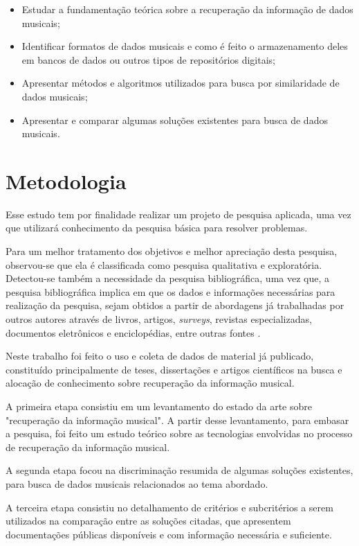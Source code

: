  \begin{itemize}
   \item Estudar a fundamentação teórica sobre a recuperação da informação de dados musicais;
   \item Identificar formatos de dados musicais e como é feito o armazenamento deles em bancos de dados ou outros tipos de repositórios digitais;
   \item Apresentar métodos e algoritmos utilizados para busca por similaridade de dados musicais;
   \item Apresentar e comparar algumas soluções existentes para busca de dados musicais.
 \end{itemize}
 
\section{Metodologia} \label{sec:metodologia}

Esse estudo tem por finalidade realizar um projeto de pesquisa aplicada, uma vez que utilizará conhecimento da pesquisa básica para resolver problemas.

Para um melhor tratamento dos objetivos e melhor apreciação desta pesquisa, observou-se que ela é classificada como pesquisa qualitativa e exploratória. Detectou-se também a necessidade da pesquisa bibliográfica, uma vez que, a pesquisa bibliográfica implica em que os dados e informações necessárias para realização da pesquisa, sejam obtidos a partir de abordagens já trabalhadas por outros autores através de livros, artigos, \textit{surveys}, revistas especializadas, documentos eletrônicos e enciclopédias, entre outras fontes \cite{ednalucia2005}.

Neste trabalho foi feito o uso e coleta de dados de material já publicado, constituído principalmente de teses, dissertações e artigos científicos na busca e alocação de conhecimento sobre recuperação da informação musical.

A primeira etapa consistiu em um levantamento do estado da arte sobre "recuperação da informação musical". A partir desse levantamento, para embasar a pesquisa, foi feito um estudo teórico sobre as tecnologias envolvidas no processo de recuperação da informação musical.

A segunda etapa focou na discriminação resumida de algumas soluções existentes, para busca de dados musicais relacionados ao tema abordado.

A terceira etapa consistiu no detalhamento de critérios e subcritérios a serem utilizados na comparação entre as soluções citadas, que apresentem documentações públicas disponíveis e com informação necessária e suficiente.

